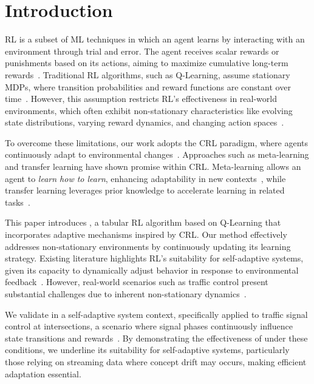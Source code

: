 
\section{Introduction}
\label{sec:introduction}

\acf{RL} is a subset of \ac{ML} techniques in which an agent learns by interacting with an environment through trial and error. The agent receives scalar rewards or punishments based on its actions, aiming to maximize cumulative long-term rewards~\cite{sutton98}. Traditional RL algorithms, such as Q-Learning, assume stationary \acp{MDP}, where transition probabilities and reward functions are constant over time~\cite{meta-rl-traffic}. However, this assumption restricts RL's effectiveness in real-world environments, which often exhibit non-stationary characteristics like evolving state distributions, varying reward dynamics, and changing action spaces~\cite{khetarpal2022continualreinforcementlearningreview}.

To overcome these limitations, our work adopts the \acf{CRL} paradigm, where agents continuously adapt to environmental changes~\cite{abel2023definitioncontinualreinforcementlearning}. Approaches such as meta-learning and transfer learning have shown promise within \ac{CRL}. Meta-learning allows an agent to \emph{learn how to learn}, enhancing adaptability in new contexts~\cite{beck2024surveymetareinforcementlearning}, while transfer learning leverages prior knowledge to accelerate learning in related tasks~\cite{chen2022transferredqlearning}.

This paper introduces \adaptiverl, a tabular RL algorithm based on Q-Learning that incorporates adaptive mechanisms inspired by \ac{CRL}. Our method effectively addresses non-stationary environments by continuously updating its learning strategy. Existing literature highlights RL's suitability for self-adaptive systems, given its capacity to dynamically adjust behavior in response to environmental feedback~\cite{HENRICHS2022106940}. However, real-world scenarios such as traffic control present substantial challenges due to inherent non-stationary dynamics~\cite{meta-rl-traffic}.

We validate \adaptiverl in a self-adaptive system context, specifically applied to traffic signal control at intersections, a scenario where signal phases continuously influence state transitions and rewards~\cite{meta-rl-traffic}. By demonstrating the effectiveness of \adaptiverl under these conditions, we underline its suitability for self-adaptive systems, particularly those relying on streaming data where concept drift may occurs, making efficient adaptation essential.

